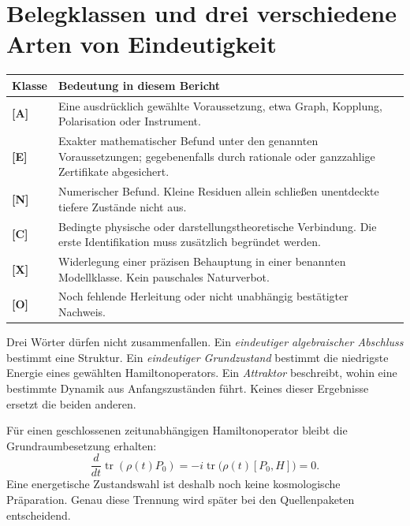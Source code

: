 \documentclass[11pt,a4paper,oneside,parskip=half,headings=normal,numbers=noenddot,bibliography=totoc]{scrreprt}
\newcommand{\tr}{\operatorname{tr}}
\newcommand{\st}[1]{\textsf{\textbf{[#1]}}}
\begin{document}
\section{Belegklassen und drei verschiedene Arten von Eindeutigkeit}
\noindent\begin{tabularx}{\textwidth}{@{}lY@{}}
\toprule
Klasse & Bedeutung in diesem Bericht\\\midrule
\st{A} & Eine ausdrücklich gewählte Voraussetzung, etwa Graph, Kopplung, Polarisation oder Instrument.\\
\st{E} & Exakter mathematischer Befund unter den genannten Voraussetzungen; gegebenenfalls durch rationale oder ganzzahlige Zertifikate abgesichert.\\
\st{N} & Numerischer Befund. Kleine Residuen allein schließen unentdeckte tiefere Zustände nicht aus.\\
\st{C} & Bedingte physische oder darstellungstheoretische Verbindung. Die erste Identifikation muss zusätzlich begründet werden.\\
\st{X} & Widerlegung einer präzisen Behauptung in einer benannten Modellklasse. Kein pauschales Naturverbot.\\
\st{O} & Noch fehlende Herleitung oder nicht unabhängig bestätigter Nachweis.\\\bottomrule
\end{tabularx}

Drei Wörter dürfen nicht zusammenfallen. Ein \emph{eindeutiger algebraischer Abschluss} bestimmt eine Struktur. Ein \emph{eindeutiger Grundzustand} bestimmt die niedrigste Energie eines gewählten Hamiltonoperators. Ein \emph{Attraktor} beschreibt, wohin eine bestimmte Dynamik aus Anfangszuständen führt. Keines dieser Ergebnisse ersetzt die beiden anderen.

Für einen geschlossenen zeitunabhängigen Hamiltonoperator bleibt die Grundraumbesetzung erhalten:
\[
 \frac{d}{dt}\tr(\rho(t)P_0)
 =-i\tr\bigl(\rho(t)[P_0,H]\bigr)=0.
\]
Eine energetische Zustandswahl ist deshalb noch keine kosmologische Präparation. Genau diese Trennung wird später bei den Quellenpaketen entscheidend.
\end{document}
